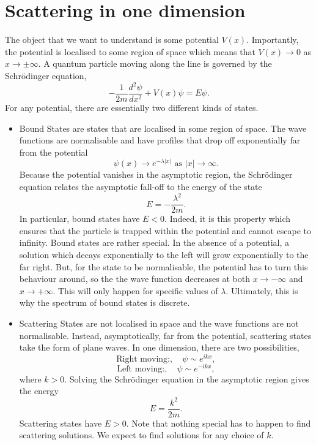 \section{Scattering in one dimension}
The object that we want to understand is some potential $V(x)$. Importantly, the potential is localised to some
region of space which means that $V (x) \to 0$ as $x \to \pm \infty$.
A quantum particle moving along the line is governed by the Schr\"{o}dinger equation,
\[-\frac{1}{2m}\frac{d^2\psi}{dx^2} + V(x)\psi = E\psi.\]
For any potential, there are essentially two different kinds of states.
\begin{itemize}
\item Bound States are states that are localised in some region of space. The wave functions are normalisable and have profiles that drop off exponentially far from the
potential 
\[\psi(x) \to e^{-\lambda|x|} \mbox{ as } |x| \to \infty.\]
Because the potential vanishes in the asymptotic region, the Schr\"{o}dinger equation relates the asymptotic fall-off to the energy of the state
\[E = -\frac{\lambda^2}{2m}.\]
In particular, bound states have $E < 0$. Indeed, it is this property which ensures that the particle is trapped within the potential and cannot escape to infinity.
Bound states are rather special. In the absence of a potential, a solution which decays exponentially to the left will grow exponentially to the far right. 
But, for the state to be normalisable, the potential has to turn this behaviour around, so the the wave function decreases at both $x \to -\infty$ and $x \to +\infty$. 
This will only happen for specific values of $\lambda$. Ultimately, this is why the spectrum of bound states is discrete.
\item Scattering States are not localised in space and the wave functions are not normalisable. 
Instead, asymptotically, far from the potential, scattering states take the form of plane waves. In one dimension, there are two possibilities,
\[\mbox{Right moving:} , \quad \psi \sim e^{ikx},\]
\[\mbox{Left moving:} , \quad \psi \sim e^{-ikx},\]
where $k > 0$. Solving the Schr\"{o}dinger equation in the asymptotic region gives the energy
\[E = \frac{k^2}{2m}.\]
Scattering states have $E > 0$. Note that nothing special has to happen to find scattering solutions. We expect to find solutions for any choice of $k$.
\end{itemize}

